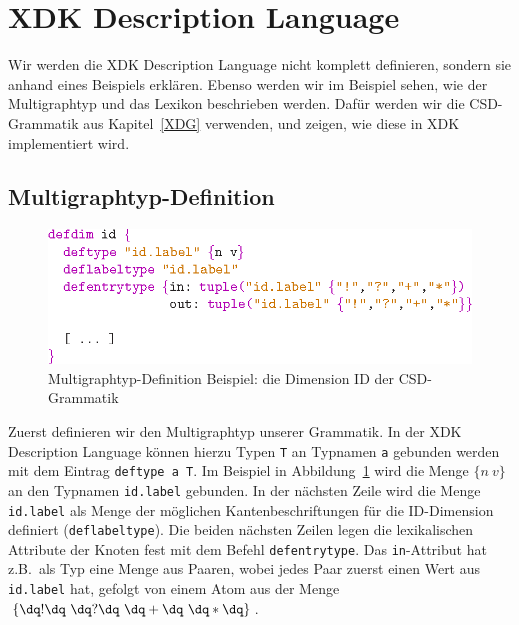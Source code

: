 \section{XDK Description Language}

Wir werden die XDK Description Language nicht komplett definieren,
sondern sie anhand eines Beispiels erkl\"aren. Ebenso werden wir im
Beispiel sehen, wie der Multigraphtyp und das Lexikon beschrieben
werden. Daf\"ur werden wir die CSD-Grammatik aus Kapitel~\ref{XDG}
verwenden, und zeigen, wie diese in XDK implementiert wird.

\subsection{Multigraphtyp-Definition}

\begin{figure}[!ht]
\begin{center}
\includegraphics[scale=1.0]{eps/metatypbps}
\end{center}

\caption{Multigraphtyp-Definition Beispiel: die Dimension ID der
CSD-Grammatik}
\label{metatypbps}
\end{figure}

Zuerst definieren wir den Multigraphtyp unserer Grammatik. In der XDK
Description Language k\"onnen hierzu Typen {\tt T} an Typnamen {\tt a}
gebunden werden mit dem Eintrag {\tt deftype a T}. Im Beispiel in
Abbildung~\ref{metatypbps} wird die Menge $\{n ~ v \}$ an den Typnamen
{\tt id.label} gebunden.  In der n\"achsten Zeile wird die Menge {\tt
id.label} als Menge der m\"oglichen Kantenbeschriftungen f\"ur die
ID-Dimension definiert ({\tt deflabeltype}).  Die beiden n\"achsten
Zeilen legen die lexikalischen Attribute der Knoten fest mit dem
Befehl {\tt defentrytype}. Das {\tt in}-Attribut hat z.B.\ als Typ
eine Menge aus Paaren, wobei jedes Paar zuerst einen Wert aus {\tt
id.label} hat, gefolgt von einem Atom aus der Menge $\{ \dq ! \dq ~
\dq ? \dq ~ \dq + \dq ~ \dq * \dq \}$.

